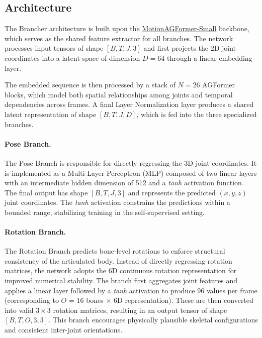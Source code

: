 \subsection{Architecture}
The Brancher architecture is built upon the \hyperref[sec:agformer]{MotionAGFormer-Small} \cite{mehraban2024motionagformer} backbone, which serves as the shared feature extractor for all branches. The network processes input tensors 
of shape $[B, T, J, 3]$ and first projects the 2D joint coordinates into a latent space of dimension $D = 64$ through a linear embedding layer.

The embedded sequence is then processed by a stack of $N=26$ AGFormer blocks, which model both spatial relationships among joints and temporal dependencies across frames. A final Layer Normalization layer produces a shared latent 
representation of shape $[B, T, J, D]$, which is fed into the three specialized branches.

\paragraph{Pose Branch.}
The Pose Branch is responsible for directly regressing the 3D joint coordinates. It is implemented as a Multi-Layer Perceptron (MLP) composed of two linear layers with an intermediate hidden dimension of 512 and a \textit{tanh} 
activation function. The final output has shape $[B, T, J, 3]$ and represents the predicted $(x, y, z)$ joint coordinates. The \textit{tanh} activation constrains the predictions within a bounded range, stabilizing training in the 
self-supervised setting.

\paragraph{Rotation Branch.}
The Rotation Branch predicts bone-level rotations to enforce structural consistency of the articulated body. Instead of directly regressing rotation matrices, the network adopts the 6D continuous rotation representation for improved 
numerical stability. 
The branch first aggregates joint features and applies a linear layer followed by a \textit{tanh} activation to produce 96 values per frame (corresponding to $O$ = 16 bones $\times$ 6D representation). These are then converted into valid 
$3 \times 3$ rotation matrices, resulting in an output tensor of shape $[B, T, O, 3, 3]$. This branch encourages physically plausible skeletal configurations and consistent inter-joint orientations.


